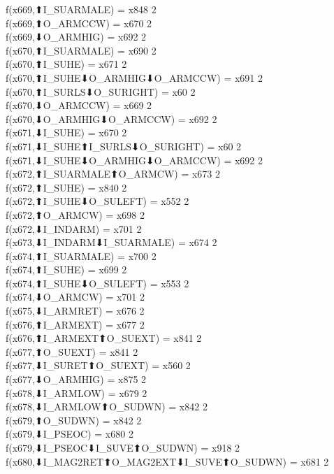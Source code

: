 f(x669,⬆I_SUARMALE) = x848 {2} \\
f(x669,⬆O_ARMCCW) = x670 {2} \\
f(x669,⬇O_ARMHIG) = x692 {2} \\
f(x670,⬆I_SUARMALE) = x690 {2} \\
f(x670,⬆I_SUHE) = x671 {2} \\
f(x670,⬆I_SUHE⬇O_ARMHIG⬇O_ARMCCW) = x691 {2} \\
f(x670,⬆I_SURLS⬇O_SURIGHT) = x60 {2} \\
f(x670,⬇O_ARMCCW) = x669 {2} \\
f(x670,⬇O_ARMHIG⬇O_ARMCCW) = x692 {2} \\
f(x671,⬇I_SUHE) = x670 {2} \\
f(x671,⬇I_SUHE⬆I_SURLS⬇O_SURIGHT) = x60 {2} \\
f(x671,⬇I_SUHE⬇O_ARMHIG⬇O_ARMCCW) = x692 {2} \\
f(x672,⬆I_SUARMALE⬆O_ARMCW) = x673 {2} \\
f(x672,⬆I_SUHE) = x840 {2} \\
f(x672,⬆I_SUHE⬇O_SULEFT) = x552 {2} \\
f(x672,⬆O_ARMCW) = x698 {2} \\
f(x672,⬇I_INDARM) = x701 {2} \\
f(x673,⬇I_INDARM⬇I_SUARMALE) = x674 {2} \\
f(x674,⬆I_SUARMALE) = x700 {2} \\
f(x674,⬆I_SUHE) = x699 {2} \\
f(x674,⬆I_SUHE⬇O_SULEFT) = x553 {2} \\
f(x674,⬇O_ARMCW) = x701 {2} \\
f(x675,⬇I_ARMRET) = x676 {2} \\
f(x676,⬆I_ARMEXT) = x677 {2} \\
f(x676,⬆I_ARMEXT⬆O_SUEXT) = x841 {2} \\
f(x677,⬆O_SUEXT) = x841 {2} \\
f(x677,⬇I_SURET⬆O_SUEXT) = x560 {2} \\
f(x677,⬇O_ARMHIG) = x875 {2} \\
f(x678,⬇I_ARMLOW) = x679 {2} \\
f(x678,⬇I_ARMLOW⬆O_SUDWN) = x842 {2} \\
f(x679,⬆O_SUDWN) = x842 {2} \\
f(x679,⬇I_PSEOC) = x680 {2} \\
f(x679,⬇I_PSEOC⬇I_SUVE⬆O_SUDWN) = x918 {2} \\
f(x680,⬇I_MAG2RET⬆O_MAG2EXT⬇I_SUVE⬆O_SUDWN) = x681 {2} \\
